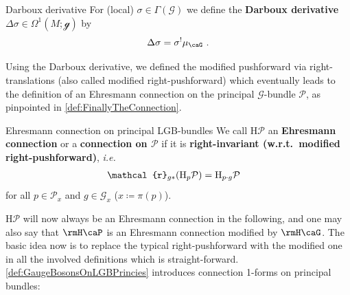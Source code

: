 \documentclass[reqno,a4paper,oneside]{amsart}
\newcommand\mutot{\mu_\caG}
\theoremstyle{plain}
\theoremstyle{remark}
\theoremstyle{definition}
\def\bas#1\eas{\begin{align*}#1\end{align*}}
\begin{document}
\begin{definitions*}{Darboux derivative}
For (local) $\sigma \in \Gamma(\mathcal{G})$ we define the \textbf{Darboux derivative $\Delta \sigma \in \Omega^1(M; \mathcal{g})$} by
\begin{equation*}
\Delta \sigma
=
\sigma^! \mutot~.
\end{equation*}
\end{definitions*}

Using the Darboux derivative, we defined the modified pushforward via right-translations (also called modified right-pushforward) which eventually leads to the definition of an Ehresmann connection on the principal $\mathcal{G}$-bundle $\mathcal{P}$, as pinpointed in \ref{def:FinallyTheConnection}.

\begin{definitions*}{Ehresmann connection on principal LGB-bundles}
We call $\mathrm{H}\mathcal{P}$ an \textbf{Ehresmann connection} or a \textbf{connection on $\mathcal{P}$} if it is \textbf{right-invariant (w.r.t.\ modified right-pushforward)}, \textit{i.e.}\
\begin{align*}
\mathcal{r}_{g*}\mleft( \mathrm{H}_p\mathcal{P} \mright)
&=
\mathrm{H}_{p\cdot g}\mathcal{P}
\end{align*}
for all $p \in \mathcal{P}_x$ and $g \in \mathcal{G}_x$ ($x \coloneqq \pi(p)$).
\end{definitions*}

$\mathrm{H}\mathcal{P}$ will now always be an Ehresmann connection in the following, and one may also say that $\rmH \caP$ is an Ehresmann connection modified by $\rmH\caG$.
The basic idea now is to replace the typical right-pushforward with the modified one in all the involved definitions which is straight-forward. \ref{def:GaugeBosonsOnLGBPrincies} introduces connection 1-forms on principal bundles:

%
\end{document}
